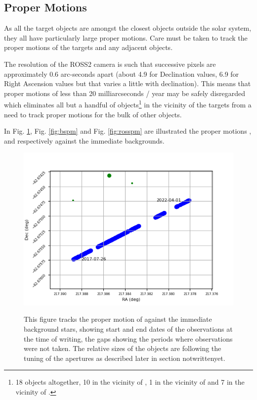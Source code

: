 \engdate
\subsection{Proper Motions}
\protect\label{section:propermotions}
As all the target objects are amongst the closest objects outside the solar
system, they all have particularly large proper motions. Care must be taken to
track the proper motions of the targets and any adjacent objects.

The resolution of the ROSS2 camera is such that successive pixels
are approximately 0.6 arc-seconds apart (about 4.9 for Declination values, 6.9
for Right Ascension values but that varies a little with declination). This
means that proper motions of less than 20 milliarcseconds / year may be safely
disregarded which eliminates all but a handful of objects\footnote{18 objects
altogether, 10 in the vicinity of \prox, 1 in the vicinity of {\bstar} and 7 in
the vicinity of \ross.} in the vicinity of the targets from a need to track proper
motions for the bulk of other objects.

In Fig. \ref{fig:proxpm}, Fig. \ref{fig:bspm} and Fig. \ref{fig:rosspm} are
illustrated the proper motions \prox, {\bstar} and {\ross} respectively against
the immediate backgrounds.

\begin{figure}[!htbp]
\begin{center}
\includegraphics[scale=0.9]{images/pmprox.png} \\
\end{center}   
\caption{This figure tracks the proper motion of {\prox} against the immediate
background stars, showing start and end dates of the observations at the time
of writing, the gaps showing the periods where observations were not taken. The
relative sizes of the objects are following the tuning of the apertures as
described later in section notwrittenyet.} \protect\label{fig:proxpm}
\end{figure}

